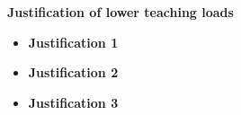 \newpage
{\bf Justification of lower teaching loads}
\begin{itemize}
\item {\bf Justification 1} \\
\blindtext


\item {\bf Justification 2} \\
\blindtext


\item {\bf Justification 3} \\
\blindtext


\end{itemize}
